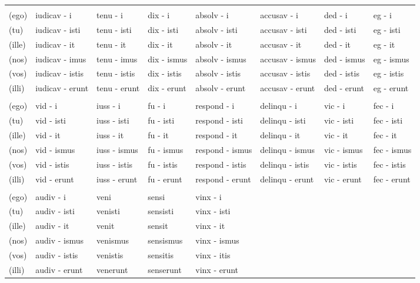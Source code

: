 \documentclass[a4paper, landscape]{article}
\begin{document}
\begin{landscape}
\begin{table}[]
\begin{tabular}{llllllll}
	& & & &  &  &  & \\
	(ego)	& iudicav - i		& tenu - i		& dix - i		& absolv - i	 & accusav - i		& ded -  i		& eg - i \\ 
	(tu)	& iudicav - isti	& tenu - isti	& dix - isti 	& absolv - isti  & accusav - isti	& ded - isti 	& eg - isti \\
	(ille)	& iudicav - it		& tenu - it 	& dix - it		& absolv - it	 & accusav - it		& ded - it		& eg - it  \\
	(nos)	& iudicav - imus	& tenu - imus	& dix - ismus	& absolv - ismus & accusav - ismus	& ded - ismus 	& eg - ismus \\
	(vos)	& iudicav - istis	& tenu - istis	& dix - istis	& absolv - istis & accusav - istis	& ded - istis	& eg - istis \\
	(illi)	& iudicav - erunt	& tenu - erunt	& dix - erunt	& absolv - erunt & accusav - erunt	& ded - erunt	& eg - erunt \\
	& & & &  &  &  & \\
	(ego)	& vid - i	  & iuss - i	 & fu - i		& respond - i		& delinqu - i		& vic - i		& fec - i \\
	(tu)	& vid - isti  & iuss - isti  & fu - isti 	& respond - isti	& delinqu - isti	& vic - isti	& fec - isti \\
	(ille)	& vid - it	  & iuss - it	 & fu - it		& respond - it		& delinqu - it		& vic - it		& fec - it \\
	(nos)	& vid - ismus & iuss - ismus & fu - ismus	& respond - ismus	& delinqu - ismus	& vic - ismus	& fec - ismus \\
	(vos)	& vid - istis & iuss - istis & fu - istis	& respond - istis	& delinqu - istis	& vic - istis	& fec - istis \\
	(illi)	& vid - erunt & iuss - erunt & fu - erunt 	& respond - erunt	& delinqu - erunt	& vic - erunt	& fec - erunt  \\
	& & & & &  &  & \\
	(ego)	& audiv - i		& veni		& sensi		& vinx - i		&  &  & \\
	(tu)	& audiv - isti	& venisti	& sensisti  & vinx - isti	&  &  & \\
	(ille)	& audiv - it	& venit		& sensit	& vinx - it		&  &  & \\
	(nos)	& audiv - ismus & venismus	& sensismus & vinx - ismus  &  &  & \\
	(vos)	& audiv - istis & venistis	& sensitis	& vinx - itis	&  &  & \\
	(illi)	& audiv - erunt	& venerunt	& senserunt	& vinx - erunt	&  &  & \\
\end{tabular}
\end{table}
\end{landscape}
\end{document}
